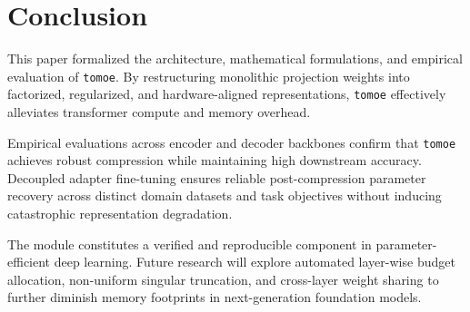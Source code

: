 \section{Conclusion}
This paper formalized the architecture, mathematical formulations, and empirical evaluation of \texttt{tomoe}. By restructuring monolithic projection weights into factorized, regularized, and hardware-aligned representations, \texttt{tomoe} effectively alleviates transformer compute and memory overhead.

Empirical evaluations across encoder and decoder backbones confirm that \texttt{tomoe} achieves robust compression while maintaining high downstream accuracy. Decoupled adapter fine-tuning ensures reliable post-compression parameter recovery across distinct domain datasets and task objectives without inducing catastrophic representation degradation.

The module constitutes a verified and reproducible component in parameter-efficient deep learning. Future research will explore automated layer-wise budget allocation, non-uniform singular truncation, and cross-layer weight sharing to further diminish memory footprints in next-generation foundation models.
